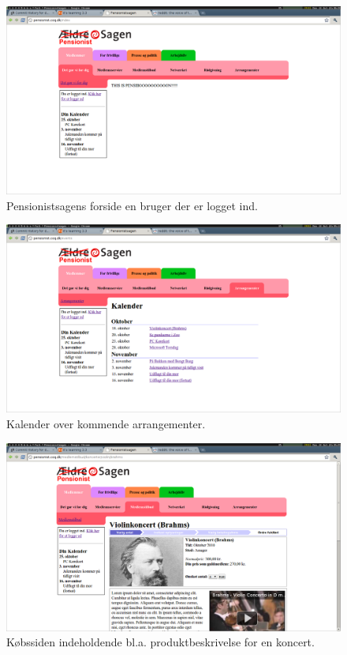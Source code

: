 \begin{figure}[h]
    \centering
    \includegraphics[width=.95\textwidth]{billeder/opgave2_trin1.png}
    \caption{Pensionistsagens forside en bruger der er logget ind.}
    \label{fig:opg2_trin1}
\end{figure}
\begin{figure}[h]
    \centering
    \includegraphics[width=.95\textwidth]{billeder/opgave2_trin2.png}
    \caption{Kalender over kommende arrangementer.}
    \label{fig:opg2_trin2}
\end{figure}
\begin{figure}[h]
    \centering
    \includegraphics[width=.95\textwidth]{billeder/opgave2_trin3.png}
    \caption{Købssiden indeholdende bl.a. produktbeskrivelse for en koncert.}
    \label{fig:opg2_trin3}
\end{figure}
